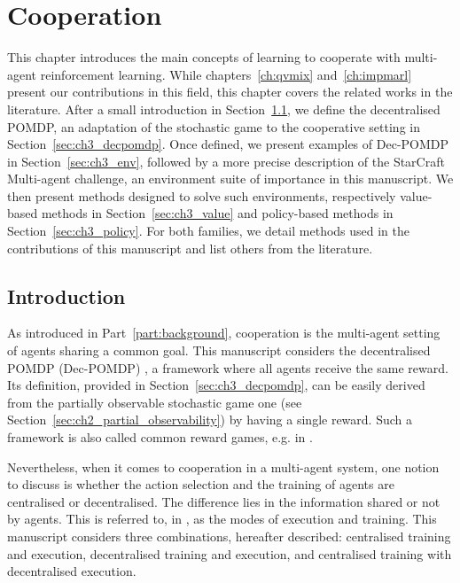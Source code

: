 \chapter{Cooperation}\label{ch:cooperation}
\begin{chapter_outline}

This chapter introduces the main concepts of learning to cooperate with multi-agent reinforcement learning.
While chapters~\ref{ch:qvmix} and~\ref{ch:impmarl} present our contributions in this field, this chapter covers the related works in the literature.
After a small introduction in Section~\ref{sec:ch3_intro}, we define the decentralised POMDP, an adaptation of the stochastic game to the cooperative setting in Section~\ref{sec:ch3_decpomdp}.
Once defined, we present examples of Dec-POMDP in Section~\ref{sec:ch3_env}, followed by a more precise description of the StarCraft Multi-agent challenge, an environment suite of importance in this manuscript.
We then present methods designed to solve such environments, respectively value-based methods in Section~\ref{sec:ch3_value} and policy-based methods in Section~\ref{sec:ch3_policy}.
For both families, we detail methods used in the contributions of this manuscript and list others from the literature.

\end{chapter_outline}


\section{Introduction}
\label{sec:ch3_intro}
As introduced in Part~\ref{part:background}, cooperation is the multi-agent setting of agents sharing a common goal.
This manuscript considers the decentralised POMDP (Dec-POMDP) \citep{DecPomdp}, a framework where all agents receive the same reward.
Its definition, provided in Section~\ref{sec:ch3_decpomdp}, can be easily derived from the partially observable stochastic game one (see Section~\ref{sec:ch2_partial_observability}) by having a single reward.
Such a framework is also called common reward games, e.g. in \cite{marl-book}.

Nevertheless, when it comes to cooperation in a multi-agent system, one notion to discuss is whether the action selection and the training of agents are centralised or decentralised.
The difference lies in the information shared or not by agents.
This is referred to, in \citep{marl-book}, as the modes of execution and training.
This manuscript considers three combinations, hereafter described: centralised training and execution, decentralised training and execution, and centralised training with decentralised execution.

